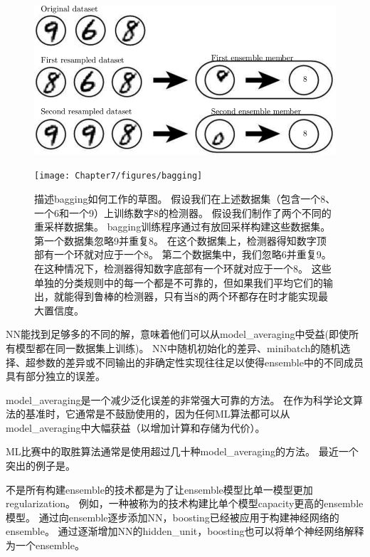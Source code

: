 \begin{figure}[!htb]
\ifOpenSource
\centerline{\includegraphics[scale=0.5]{images/58.png}}
\else
\centerline{\texttt{[image: Chapter7/figures/bagging]}}
\fi
\caption{描述\gls{bagging}如何工作的草图。
假设我们在上述数据集（包含一个8、一个6和一个9）上训练数字8的检测器。
假设我们制作了两个不同的重采样数据集。
\gls{bagging}训练程序通过有放回采样构建这些数据集。
第一个数据集忽略9并重复8。
在这个数据集上，检测器得知数字顶部有一个环就对应于一个8。
第二个数据集中，我们忽略6并重复9。
在这种情况下，检测器得知数字底部有一个环就对应于一个8。
这些单独的分类规则中的每一个都是不可靠的，但如果我们平均它们的输出，就能得到鲁棒的检测器，只有当8的两个环都存在时才能实现最大置信度。
}
\label{fig:chap7_bagging}
\end{figure}

\gls{NN}能找到足够多的不同的解，意味着他们可以从\gls{model_averaging}中受益(即使所有模型都在同一数据集上训练)。
\gls{NN}中随机初始化的差异、\gls{minibatch}的随机选择、超参数的差异或不同输出的非确定性实现往往足以使得\gls{ensemble}中的不同成员具有部分独立的误差。


\gls{model_averaging}是一个减少泛化误差的非常强大可靠的方法。
在作为科学论文算法的基准时，它通常是不鼓励使用的，因为任何\gls{ML}算法都可以从\gls{model_averaging}中大幅获益（以增加计算和存储为代价）。

\gls{ML}比赛中的取胜算法通常是使用超过几十种\gls{model_averaging}的方法。
最近一个突出的例子是\citep{Koren-2009}。

不是所有构建\gls{ensemble}的技术都是为了让\gls{ensemble}模型比单一模型更加\gls{regularization}。
例如，一种被称为的技术\citep{Freund-Schapire-1996b,Freund-Schapire-1996a}构建比单个模型\gls{capacity}更高的\gls{ensemble}模型。
通过向\gls{ensemble}逐步添加\gls{NN}，\gls{boosting}已经被应用于构建神经网络的\gls{ensemble}\citep{Schwenk-Bengio-1998}。
通过逐渐增加\gls{NN}的\gls{hidden_unit}，\gls{boosting}也可以将单个神经网络解释为一个\gls{ensemble}\citep{Bengio-et-al-2006a}。

